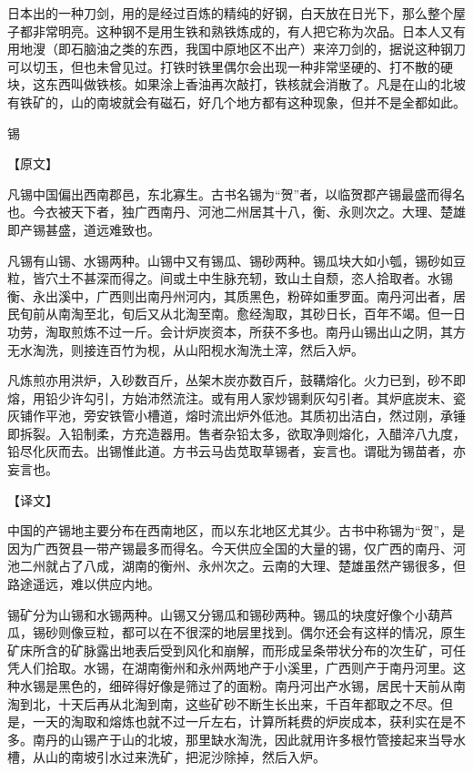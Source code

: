 \documentclass[12pt,UTF8]{ctexbook}
\begin{document}
日本出的一种刀剑，用的是经过百炼的精纯的好钢，白天放在日光下，那么整个屋子都非常明亮。这种钢不是用生铁和熟铁炼成的，有人把它称为次品。日本人又有用地溲（即石脑油之类的东西，我国中原地区不出产）来淬刀剑的，据说这种钢刀可以切玉，但也未曾见过。打铁时铁里偶尔会出现一种非常坚硬的、打不散的硬块，这东西叫做铁核。如果涂上香油再次敲打，铁核就会消散了。凡是在山的北坡有铁矿的，山的南坡就会有磁石，好几个地方都有这种现象，但并不是全都如此。

锡

【原文】

凡锡中国偏出西南郡邑，东北寡生。古书名锡为“贺”者，以临贺郡产锡最盛而得名也。今衣被天下者，独广西南丹、河池二州居其十八，衡、永则次之。大理、楚雄即产锡甚盛，道远难致也。

凡锡有山锡、水锡两种。山锡中又有锡瓜、锡砂两种。锡瓜块大如小瓠，锡砂如豆粒，皆穴土不甚深而得之。间或土中生脉充轫，致山土自颓，恣人拾取者。水锡衡、永出溪中，广西则出南丹州河内，其质黑色，粉碎如重罗面。南丹河出者，居民旬前从南淘至北，旬后又从北淘至南。愈经淘取，其砂日长，百年不竭。但一日功劳，淘取煎炼不过一斤。会计炉炭资本，所获不多也。南丹山锡出山之阴，其方无水淘洗，则接连百竹为枧，从山阳枧水淘洗土滓，然后入炉。

凡炼煎亦用洪炉，入砂数百斤，丛架木炭亦数百斤，鼓鞲熔化。火力已到，砂不即熔，用铅少许勾引，方始沛然流注。或有用人家炒锡剩灰勾引者。其炉底炭末、瓷灰铺作平池，旁安铁管小槽道，熔时流出炉外低池。其质初出洁白，然过刚，承锤即拆裂。入铅制柔，方充造器用。售者杂铅太多，欲取净则熔化，入醋淬八九度，铅尽化灰而去。出锡惟此道。方书云马齿苋取草锡者，妄言也。谓砒为锡苗者，亦妄言也。

【译文】

中国的产锡地主要分布在西南地区，而以东北地区尤其少。古书中称锡为“贺”，是因为广西贺县一带产锡最多而得名。今天供应全国的大量的锡，仅广西的南丹、河池二州就占了八成，湖南的衡州、永州次之。云南的大理、楚雄虽然产锡很多，但路途遥远，难以供应内地。

锡矿分为山锡和水锡两种。山锡又分锡瓜和锡砂两种。锡瓜的块度好像个小葫芦瓜，锡砂则像豆粒，都可以在不很深的地层里找到。偶尔还会有这样的情况，原生矿床所含的矿脉露出地表后受到风化和崩解，而形成呈条带状分布的次生矿，可任凭人们拾取。水锡，在湖南衡州和永州两地产于小溪里，广西则产于南丹河里。这种水锡是黑色的，细碎得好像是筛过了的面粉。南丹河出产水锡，居民十天前从南淘到北，十天后再从北淘到南，这些矿砂不断生长出来，千百年都取之不尽。但是，一天的淘取和熔炼也就不过一斤左右，计算所耗费的炉炭成本，获利实在是不多。南丹的山锡产于山的北坡，那里缺水淘洗，因此就用许多根竹管接起来当导水槽，从山的南坡引水过来洗矿，把泥沙除掉，然后入炉。
\end{document}
